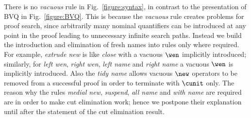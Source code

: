 \documentclass[UKenglish,acmsmall,authorversion]{acmart}
\theoremstyle{plain}
\begin{document}
There is no \textit{vacuous} rule in Fig.~\ref{figure:syntax}, in contrast to the presentation of \textsf{BVQ} in Fig.~\ref{figure:BVQ}.
This is because the \textit{vacuous} rule creates problems for proof search, since arbitrarily many nominal quantifiers can be introduced at any point in the proof leading to unnecessary infinite search paths. Instead we build the introduction and elimination of fresh names into rules only where required.
For example, \textit{extrude new} is like \textit{close} with a vacuous $\wen$ implicitly introduced;
similarly, for \textit{left wen}, \textit{right wen}, \textit{left name} and \textit{right name} a vacuous $\wen$ is implicitly introduced.
Also the \textit{tidy name} allows vacuous $\new$ operators to be removed from a successful proof in order to terminate with $\cunit$ only.
The reason why the rules \textit{medial new}, \textit{suspend}, \textit{all name} and \textit{with name} are required are in order to make cut elimination work; hence we postpone their explanation until after the statement of the cut elimination result.

\end{document}
